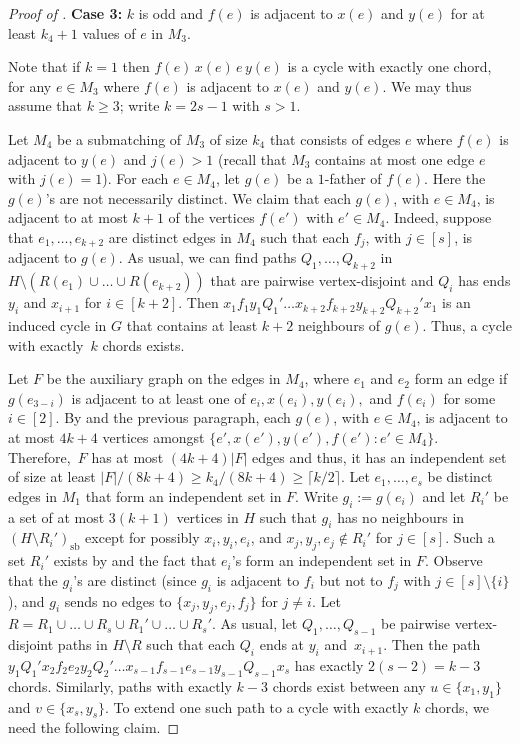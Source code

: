 \documentclass[11pt,english]{article}
\theoremstyle{plain}
\theoremstyle{definition}
\theoremstyle{remark}
\newcommand{\ceil}[1]{
    \lceil #1 \rceil
}
\newcommand{\sbb}{\mathrm{sb}}
\begin{document}
\begin{proof}[Proof of ]
            \medskip
			\noindent\textbf{Case 3:} $k$ is odd and $f(e)$ is adjacent to $x(e)$ and $y(e)$ for at least $k_4 + 1$ values of $e$ in $M_3$.

				Note that if $k = 1$ then $f(e)\, x(e)\, e\, y(e)$ is a cycle with exactly one chord, for any $e \in M_3$ where $f(e)$ is adjacent to $x(e)$ and $y(e)$. We may thus assume that $k \ge 3$; write $k = 2s- 1$ with $s>1$.

				Let $M_4$ be a submatching of $M_3$ of size $k_4$ that consists of edges $e$ where $f(e)$ is adjacent to $y(e)$ and $j(e) > 1$ (recall that $M_3$ contains at most one edge $e$ with $j(e) = 1$). 
				For each $e \in M_4$, let $g(e)$ be a $1$-father of $f(e)$. Here the $g(e)$'s are not necessarily distinct. We claim that each $g(e)$, with $e\in M_4$, is adjacent to at most $k+1$ of the vertices $f(e')$ with $e' \in M_4$. 
				Indeed, suppose that $e_1, \ldots, e_{k+2}$ are distinct edges in $M_4$ such that each $f_j$, with $j \in [s]$, is adjacent to $g(e)$. As usual, we can find paths $Q_1, \ldots, Q_{k+2}$ in $H \setminus (R(e_1) \cup \ldots \cup R(e_{k+2}))$ that are pairwise vertex-disjoint and $Q_i$ has ends $y_i$ and $x_{i+1}$ for $i \in [k+2]$. 
				Then $x_1 f_1 y_1 Q_1' \ldots x_{k+2} f_{k+2} y_{k+2} Q_{k+2}'x_1$ is an induced cycle in $G$ that contains at least $k+2$ neighbours of $g(e)$.
				Thus, a cycle with exactly~$k$ chords exists. 

				Let $F$ be the auxiliary graph on the edges in $M_4$, where $e_1$ and $e_2$ form an edge if $g(e_{3-i})$ is adjacent to at least one of $e_i, x(e_i), y(e_i),$ and $f(e_i)$ for some $i \in [2]$. 
				By  and the previous paragraph, each $g(e)$, with $e\in M_4$, is adjacent to at most $4k+4$ vertices amongst $\{e', x(e'), y(e'), f(e'): e' \in M_4\}$. 
				Therefore,~$F$ has at most $(4k+4)|F|$ edges and thus, it has an independent set of size at least $|F|/(8k+4) \ge k_4/(8k+4) \ge \ceil{k/2}$. Let $e_1, \ldots, e_{s}$ be distinct edges in $M_1$ that form an independent set in $F$. 
				Write $g_i:=g(e_i)$ and let $R_i'$ be a set of at most $3(k+1)$ vertices in $H$ such that $g_i$ has no neighbours in $(H \setminus R_i')_\sbb$ except for possibly $x_i, y_i, e_i$, and $x_j, y_j, e_j \notin R_i'$ for $j \in [s]$. 
				Such a set $R_i'$ exists by  and the fact that $e_i$'s form an independent set in $F$. 
				Observe that the $g_i$'s are distinct (since $g_i$ is adjacent to $f_i$ but not to $f_j$ with $j \in [s] \setminus \{i\}$), and $g_i$ sends no edges to $\{x_j, y_j, e_j, f_j\}$ for $j \neq i$.
				Let $R = R_1 \cup \ldots \cup R_{s} \cup R_1' \cup \ldots \cup R_{s}'$.
				As usual, let $Q_1, \ldots, Q_{s-1}$ be pairwise vertex-disjoint paths in $H \setminus R$ such that each $Q_i$ ends at $y_i$ and~$x_{i+1}$. 
				Then the path $y_1 Q_1' x_2 f_2 e_2 y_2 Q_2' \ldots x_{s-1} f_{s-1} e_{s-1} y_{s-1} Q_{s-1}x_s$ has exactly $2(s-2)=k-3$ chords. Similarly, paths with exactly $k-3$ chords exist between any $u\in\{x_1, y_1\}$ and $v\in \{x_{s}, y_{s}\}$.
				To extend one such path to a cycle with exactly $k$ chords, we need the following claim.
				

\end{proof}
\end{document}
